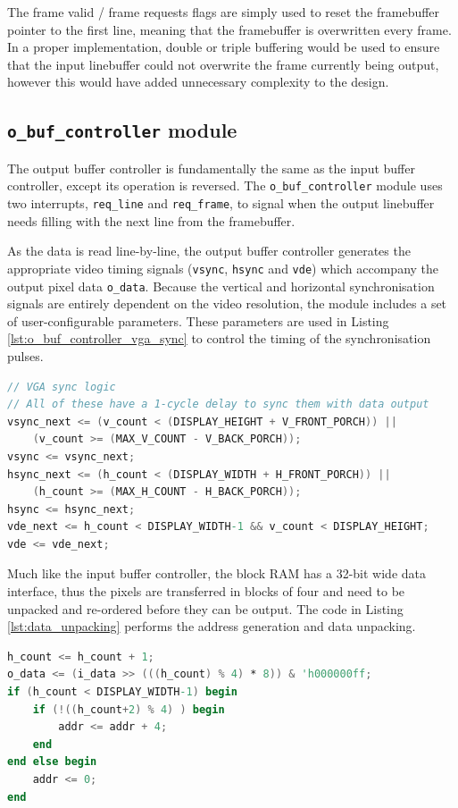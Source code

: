 The frame valid / frame requests flags are simply used to reset the framebuffer pointer to the first line, meaning that the framebuffer is overwritten every frame. In a proper implementation, double or triple buffering would be used to ensure that the input linebuffer could not overwrite the frame currently being output, however this would have added unnecessary complexity to the design.

\subsection{\texttt{o\_buf\_controller} module}
The output buffer controller is fundamentally the same as the input buffer controller, except its operation is reversed. The \texttt{o\_buf\_controller} module uses two interrupts, \texttt{req\_line} and \texttt{req\_frame}, to signal when the output linebuffer needs filling with the next line from the framebuffer.

As the data is read line-by-line, the output buffer controller generates the appropriate video timing signals (\texttt{vsync}, \texttt{hsync} and \texttt{vde}) which accompany the output pixel data \texttt{o\_data}. Because the vertical and horizontal synchronisation signals are entirely dependent on the video resolution, the module includes a set of user-configurable parameters. These parameters are used in Listing \ref{lst:o_buf_controller_vga_sync} to control the timing of the synchronisation pulses.

\begin{lstlisting}[caption={Output buffer controller video synchronisation generation logic.}, label={lst:o_buf_controller_vga_sync}, language=Verilog]
// VGA sync logic
// All of these have a 1-cycle delay to sync them with data output
vsync_next <= (v_count < (DISPLAY_HEIGHT + V_FRONT_PORCH)) ||
    (v_count >= (MAX_V_COUNT - V_BACK_PORCH));
vsync <= vsync_next;
hsync_next <= (h_count < (DISPLAY_WIDTH + H_FRONT_PORCH)) ||
    (h_count >= (MAX_H_COUNT - H_BACK_PORCH));
hsync <= hsync_next;
vde_next <= h_count < DISPLAY_WIDTH-1 && v_count < DISPLAY_HEIGHT;
vde <= vde_next;
\end{lstlisting}

Much like the input buffer controller, the block RAM has a 32-bit wide data interface, thus the pixels are transferred in blocks of four and need to be unpacked and re-ordered before they can be output. The code in Listing \ref{lst:data_unpacking} performs the address generation and data unpacking.

\begin{lstlisting}[caption={Address generation and data unpacking logic for output buffer controller.}, label={lst:data_unpacking}, language=Verilog]
h_count <= h_count + 1;
o_data <= (i_data >> (((h_count) % 4) * 8)) & 'h000000ff;
if (h_count < DISPLAY_WIDTH-1) begin
    if (!((h_count+2) % 4) ) begin
        addr <= addr + 4;
    end
end else begin
    addr <= 0;
end
\end{lstlisting}